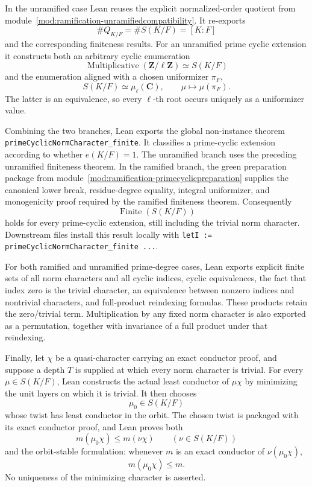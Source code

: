 \begin{theorem}
In the unramified case Lean reuses the explicit normalized-order quotient
from module~\ref{mod:ramification-unramifiedcompatibility}.  It re-exports
\[
 \#Q_{K/F}=\#S(K/F)=[K:F]
\]
and the corresponding finiteness results.  For an unramified prime cyclic
extension it constructs both an arbitrary cyclic enumeration
\[
 \operatorname{Multiplicative}(\mathbf Z/\ell\mathbf Z)
 \simeq S(K/F)
\]
and the enumeration aligned with a chosen uniformizer $\pi_F$,
\[
 S(K/F)\simeq\mu_\ell(\mathbf C),\qquad
 \mu\longmapsto\mu(\pi_F).
\]
The latter is an equivalence, so every $\ell$-th root occurs uniquely as a
uniformizer value.

Combining the two branches, Lean exports the global non-instance theorem
\texttt{primeCyclicNormCharacter\_finite}.  It classifies a prime-cyclic
extension according to whether $e(K/F)=1$.  The unramified branch uses the
preceding unramified finiteness theorem.  In the ramified branch, the green
preparation package from
module~\ref{mod:ramification-primecyclicpreparation} supplies the canonical
lower break, residue-degree equality, integral uniformizer, and monogenicity
proof required by the ramified finiteness theorem.  Consequently
\[
 \operatorname{Finite}(S(K/F))
\]
holds for every prime-cyclic extension, still including the trivial norm
character.  Downstream files install this result locally with
\texttt{letI := primeCyclicNormCharacter\_finite ...}.

For both ramified and unramified prime-degree cases, Lean exports explicit
finite sets of all norm characters and all cyclic indices, cyclic
equivalences, the fact that index zero is the trivial character, an
equivalence between nonzero indices and nontrivial characters, and
full-product reindexing formulas.  These products retain the zero/trivial
term.  Multiplication by any fixed norm character is also exported as a
permutation, together with invariance of a full product under that
reindexing.

Finally, let $\chi$ be a quasi-character carrying an exact conductor proof,
and suppose a depth $T$ is supplied at which every norm character is
trivial.  For every $\mu\in S(K/F)$, Lean constructs the actual least
conductor of $\mu\chi$ by minimizing the unit layers on which it is trivial.
It then chooses
\[
 \mu_0\in S(K/F)
\]
whose twist has least conductor in the orbit.  The chosen twist is packaged
with its exact conductor proof, and Lean proves both
\[
 m(\mu_0\chi)\le m(\nu\chi)
 \qquad(\nu\in S(K/F))
\]
and the orbit-stable formulation: whenever $m$ is an exact conductor of
$\nu(\mu_0\chi)$,
\[
 m(\mu_0\chi)\le m.
\]
No uniqueness of the minimizing character is asserted.


\end{theorem}
